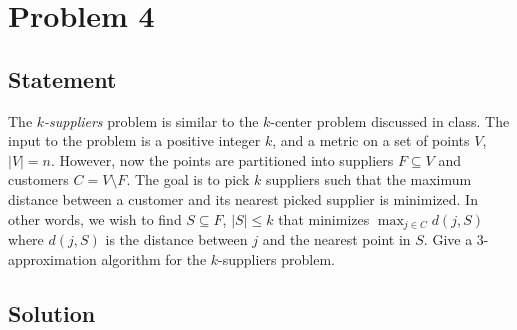 \documentclass[a4paper]{article}
\begin{document}
\section{Problem 4}
\subsection{Statement}
The \emph{$k$-suppliers} problem is similar to the $k$-center problem discussed in class. The input to the problem is a positive integer $k$, and a metric on a set of points $V$, $|V| = n$. However,
now the points are partitioned into suppliers $F \subseteq V$ and customers $C=V\setminus F$. The goal is to pick $k$ suppliers such that the maximum distance between a customer and its nearest picked
supplier is minimized. In other words, we wish to find $S \subseteq F$, $|S| \le k$ that minimizes $\max_{j \in C} d(j, S)$ where $d(j, S)$ is the distance between $j$ and the nearest point in $S$.
Give a $3$-approximation algorithm for the $k$-suppliers problem.
\subsection{Solution}
\end{document}
